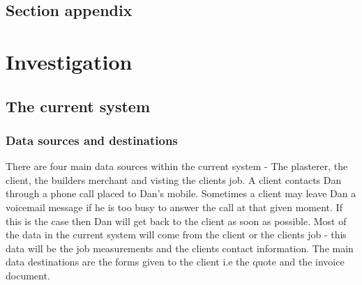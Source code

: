 \subsection{Section appendix}

\section{Investigation}

\subsection{The current system}





\subsubsection{Data sources and destinations}


\begin{flushleft}
	There are four main data sources within the current system - The plasterer, the client, the builders merchant and visting the clients job. A client contacts Dan through a phone call placed to Dan's mobile. Sometimes a client may leave Dan a voicemail message if he is too busy to answer the call at that given moment. If this is the case then Dan will get back to the client as soon as possible. Most of the data in the current system will come from the client or the clients job - this data will be the job measurements and the clients contact information. The main data destinations are the forms given to the client i.e the quote and the invoice document.

\end{flushleft}

